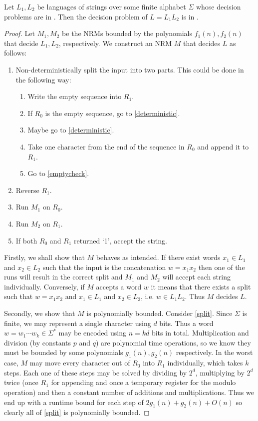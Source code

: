 \documentclass{article}
\begin{document}
\begin{claim*}[c]
	Let $L_1,L_2$ be languages of strings over some finite alphabet $\Sigma$ whose decision problems are in
	\nptime. Then the decision problem of $L=L_1L_2$ is in \nptime.
	\begin{proof}
		Let $M_1,M_2$ be the NRMs bounded by the polynomials $f_1(n),f_2(n)$ that decide $L_1,L_2$, respectively.
		We construct an NRM $M$ that decides $L$ as follows:
		\begin{enumerate}[label=M\arabic*]
			\item \label{split} Non-deterministically split the input into two parts. This could be done in the following way:
			      \begin{enumerate}
				      \item Write the empty sequence into $R_1$.
				      \item \label{emptycheck} If $R_0$ is the empty sequence, go to \ref{deterministic}.
				      \item Maybe go to \ref{deterministic}.
				      \item Take one character from the end of the sequence in $R_0$ and append it to $R_1$.
				      \item Go to \ref{emptycheck}.
			      \end{enumerate}
			\item \label{deterministic} Reverse $R_1$.
			\item \label{runm1} Run $M_1$ on $R_0$.
			\item \label{runm2} Run $M_2$ on $R_1$.
			\item \label{trivial} If both $R_0$ and $R_1$ returned `1', accept the string.
		\end{enumerate}
		Firstly, we shall show that $M$ behaves as intended. If there exist words $x_1\in L_1$ and $x_2\in L_2$ such that the input
		is the concatenation $w=x_1x_2$ then one of the runs will result in the correct
		split and $M_1$ and $M_2$ will accept each string individually.  Conversely,
		if $M$ accepts a word $w$ it means that there exists a split such that
		$w=x_1x_2$ and $x_1\in L_1$ and $x_2\in L_2$, i.e. $w\in L_1L_2$. Thus $M$
		decides $L$.

		Secondly, we show that $M$ is polynomially bounded. Consider \ref{split}. Since $\Sigma$ is finite, we may
		represent a single character using
		$d$ bits. Thus a word $w=w_1\cdots w_k \in\Sigma^*$ may be encoded using $n=kd$ bits in total.
		Multiplication and division (by constants $p$ and $q$) are polynomial time operations, so we know
		they must be bounded by some polynomials $g_1(n),g_2(n)$ respectively. In the worst case, $M$ may move
		every character out of $R_0$ into $R_1$ individually, which takes $k$ steps. Each one of these steps
		may be solved by dividing by $2^d$, multiplying by $2^d$ twice (once $R_1$ for appending and once a
		temporary register for the modulo operation) and then a constant number of additions and multiplications.
		Thus we end up with a runtime bound for each step of $2g_1(n)+g_2(n)+O(n)$ so clearly all of \ref{split}
		is polynomially bounded.


\end{proof}
\end{claim*}
\end{document}
